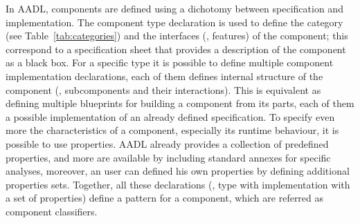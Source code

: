 In AADL, components are defined using a dichotomy between specification and implementation. The component type declaration is used to define the category (see Table~\ref{tab:categories}) and the interfaces (\ie, features) of the component; this correspond to a specification sheet that provides a description of the component as a black box. For a specific type it is possible to define multiple component implementation declarations, each of them defines internal structure of the component (\ie, subcomponents and their interactions). This is equivalent as defining multiple blueprints for building a component from its parts, each of them a possible implementation of an already defined specification. To specify even more the characteristics of a component, especially its runtime behaviour, it is possible to use properties. AADL already provides a collection of predefined properties, and more are available by including standard annexes for specific analyses, moreover, an user can defined his own properties by defining additional properties sets. Together, all these declarations (\ie, type with implementation with a set of properties) define a pattern for a component, which are referred as component classifiers.
 
